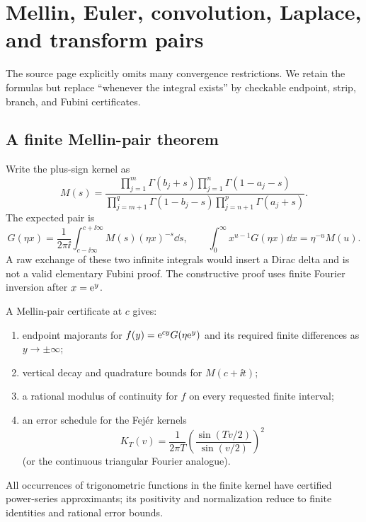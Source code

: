 \section{Mellin, Euler, convolution, Laplace, and transform pairs}\label{sec:transforms}

The source page explicitly omits many convergence restrictions.  We retain the
formulas but replace ``whenever the integral exists'' by checkable endpoint,
strip, branch, and Fubini certificates.

\subsection{A finite Mellin-pair theorem}

Write the plus-sign kernel as
\begin{equation}\label{eq:M-kernel}
 M(s)=
 \frac{\prod_{j=1}^{m}\Gamma(b_j+s)
       \prod_{j=1}^{n}\Gamma(1-a_j-s)}
      {\prod_{j=m+1}^{q}\Gamma(1-b_j-s)
       \prod_{j=n+1}^{p}\Gamma(a_j+s)}.
\end{equation}
The expected pair is
\begin{equation}\label{eq:mellin-pair}
 G(\eta x)=\frac1{2\pi\ii}\int_{c-\ii\infty}^{c+\ii\infty}
 M(s)(\eta x)^{-s}\dd s,
 \qquad
 \int_0^\infty x^{u-1}G(\eta x)\dd x=\eta^{-u}M(u).
\end{equation}
A raw exchange of these two infinite integrals would insert a Dirac delta and
is not a valid elementary Fubini proof.  The constructive proof uses finite
Fourier inversion after $x=\mathrm e^y$.

\begin{definition}\label{def:mellin-cert}
A Mellin-pair certificate at $c$ gives:
\begin{enumerate}
\item endpoint majorants for $f(y)=\mathrm e^{cy}G(\eta\mathrm e^y)$ and its required finite
      differences as $y\to\pm\infty$;
\item vertical decay and quadrature bounds for $M(c+\ii t)$;
\item a rational modulus of continuity for $f$ on every requested finite
      interval;
\item an error schedule for the Fej\'er kernels
\[
 K_T(v)=\frac1{2\pi T}\left(\frac{\sin(Tv/2)}{\sin(v/2)}\right)^2
\]
(or the continuous triangular Fourier analogue).
\end{enumerate}
\end{definition}
All occurrences of trigonometric functions in the finite kernel have certified
power-series approximants; its positivity and normalization reduce to finite
identities and rational error bounds.

